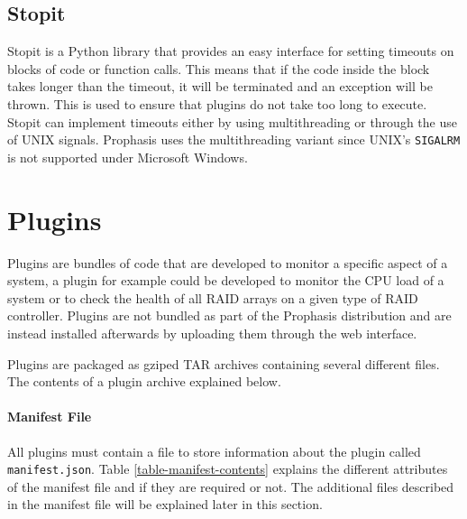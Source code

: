 \documentclass[bsc,logo,twoside,parskip,singlespacing,notimes]{infthesis}
\begin{document}
\subsection{Stopit}

	Stopit is a Python library that provides an easy interface for setting timeouts
	on blocks of code or function calls.  This means that if the code inside the
	block takes longer than the timeout, it will be terminated and an exception
	will be thrown.  This is used to ensure that plugins do not take too long to
	execute.  Stopit can implement timeouts either by using multithreading or
	through the use of UNIX signals.  Prophasis uses the multithreading variant
 	since UNIX's \texttt{SIGALRM} is not supported under Microsoft Windows.

\section{Plugins}
	Plugins are bundles of code that are developed to monitor a specific aspect of
	a system, a plugin for example could be developed to monitor the CPU load of a
	system or to check the health of all RAID arrays on a given type of RAID
	controller.  Plugins are not bundled as part of the Prophasis distribution and
	are instead installed afterwards by uploading them through the web interface.
	

	Plugins are packaged as gziped TAR archives containing several different files.
	The contents of a plugin archive explained below.

\paragraph*{Manifest File}
	All plugins must contain a file to store information about the plugin called
 	\texttt{manifest.json}. Table \ref{table-manifest-contents} explains the
 	different attributes of the manifest file and if they are required or not.
 	The additional files described in the manifest file will be explained later in
 	this section.
\end{document}
